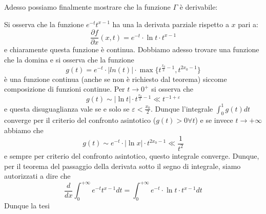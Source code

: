 \documentclass{report}
\begin{document}
\noindent Adesso possiamo finalmente mostrare che la funzione $\Gamma$ è derivabile:
\begin{myproof}
Si osserva che la funzione $e^{-t}t^{x-1}$ ha una la derivata parziale rispetto a $x$ pari a:
$$
	\frac{\partial f}{\partial x}(x, t)=e^{-t} \cdot \ln{t} \cdot t^{x-1}
$$
e chiaramente questa funzione è continua. Dobbiamo adesso trovare una funzione che la domina e si osserva che la funzione
$$
	g(t) = e^{-t} \cdot |ln(t)| \cdot \max\{t^{\frac{x_0}{2}-1}, t^{2x_0 - 1}\}
$$
è una funzione continua (anche se non è richiesto dal teorema) siccome composizione di funzioni continue. Per $t \to 0^+$ si osserva che
$$
	g(t) \sim |\ln{t}| \cdot t^{\frac{x_0}{2}-1} \ll t^{-1+\varepsilon}
$$
e questa disuguaglianza vale se e solo se $\varepsilon < \frac{x_0}{2}$. Dunque l'integrale $\int_0^1 g(t)dt$ converge per il criterio del confronto asintotico ($g(t) > 0 \forall t$) e se invece $t \to +\infty$ abbiamo che
$$
	g(t) \sim e^{-t} \cdot |\ln{x}| \cdot t^{2x_0 - 1} \ll \frac{1}{t^2}
$$
e sempre per criterio del confronto asintotico, questo integrale converge. Dunque, per il teorema del passaggio della derivata sotto il segno di integrale, siamo autorizzati a dire che
$$
	\frac{d}{dx} \int_{0}^{+\infty} e^{-t}t^{x-1}dt = \int_{0}^{+\infty} e^{-t} \cdot \ln{t} \cdot t^{x-1}dt
$$
Dunque la tesi
\end{myproof}
\end{document}
